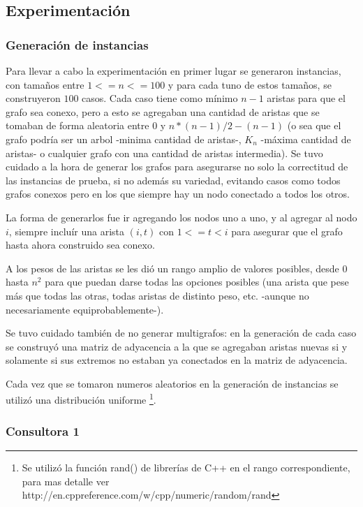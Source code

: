 \documentclass[A4paper,oneside,fleqn,11pt]{article}
\theoremstyle{definition}
\begin{document}
\subsection{Experimentación}

\subsubsection{Generación de instancias}
Para llevar a cabo la experimentación en primer lugar se generaron instancias, con tamaños entre $1<=n<=100$ y para cada tuno de estos tamaños, se construyeron $100$ casos. Cada caso tiene como mínimo $n-1$ aristas para que el grafo sea conexo, pero a esto se agregaban una cantidad de aristas que se tomaban de forma aleatoria entre $0$ y $n*(n-1)/2 - (n-1)$  (o sea que el grafo podría ser un arbol -minima cantidad de aristas-, $K_{n}$ -máxima cantidad de aristas- o cualquier grafo con una cantidad de aristas intermedia). Se tuvo cuidado a la hora de generar los grafos para asegurarse no solo la correctitud de las instancias de prueba, si no además su variedad, evitando casos como todos grafos conexos pero en los que siempre hay un nodo conectado a todos los otros.

La forma de generarlos fue ir agregando los nodos uno a uno, y al agregar al nodo $i$, siempre incluír una arista $(i,t)$ con $1<=t<i$ para asegurar que el grafo hasta ahora construido sea conexo.

A los pesos de las aristas se les dió un rango amplio de valores posibles, desde $0$ hasta $n^2$ para que puedan darse todas las opciones posibles (una arista que pese más que todas las otras, todas aristas de distinto peso, etc. -aunque no necesariamente equiprobablemente-).

Se tuvo cuidado también de no generar multigrafos: en la generación de cada caso se construyó una matriz de adyacencia a la que se agregaban aristas nuevas si y solamente si sus extremos no estaban ya conectados en la matriz de adyacencia.

Cada vez que se tomaron numeros aleatorios en la generación de instancias se utilizó una distribución uniforme 
\footnote{ Se utilizó la función rand() de librerías de C++ en el rango correspondiente, para mas detalle ver http://en.cppreference.com/w/cpp/numeric/random/rand }.


\subsubsection{Consultora 1}
\end{document}
